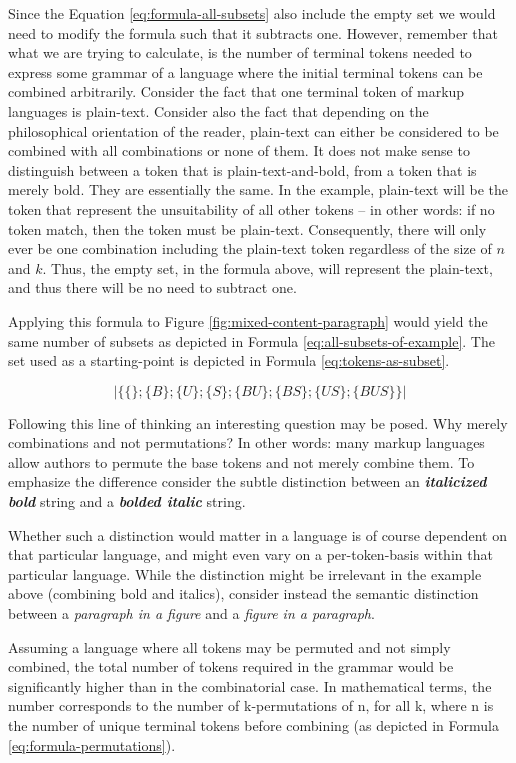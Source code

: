 \documentclass{scrreprt}
\begin{document}
Since the Equation \ref{eq:formula-all-subsets} also include the empty set we would need to modify the formula such that it subtracts one. However, remember that what we are trying to calculate, is the number of terminal tokens needed to express some grammar of a language where the initial terminal tokens can be combined arbitrarily. Consider the fact that one terminal token of markup languages is plain-text. Consider also the fact that depending on the philosophical orientation of the reader, plain-text can either be considered to be combined with all combinations or none of them. It does not make sense to distinguish between a token that is plain-text-and-bold, from a token that is merely bold. They are essentially the same. In the example, plain-text will be the token that represent the unsuitability of all other tokens -- in other words: if no token match, then the token must be plain-text. Consequently, there will only ever be one combination including the plain-text token regardless of the size of \(n\) and \(k\). Thus, the empty set, in the formula above, will represent the plain-text, and thus there will be no need to subtract one.

Applying this formula to Figure \ref{fig:mixed-content-paragraph} would yield the same number of subsets as depicted in Formula \ref{eq:all-subsets-of-example}. The set used as a starting-point is depicted in Formula \ref{eq:tokens-as-subset}.

\begin{equation}
|\{\{\};\{B\};\{U\};\{S\};\{BU\};\{BS\};\{US\};\{BUS\}\}|
\label{eq:all-subsets-of-example}
\end{equation}


Following this line of thinking an interesting question may be posed. Why merely combinations and not permutations? In other words: many markup languages allow authors to permute the base tokens and not merely combine them. To emphasize the difference consider the subtle distinction between an \textit{\textbf{italicized bold}} string and a \textit{\textbf{bolded italic}} string.

Whether such a distinction would matter in a language is of course dependent on that particular language, and might even vary on a per-token-basis within that particular language. While the distinction might be irrelevant in the example above (combining bold and italics), consider instead the semantic distinction between a \emph{paragraph in a figure} and a \emph{figure in a paragraph}.

Assuming a language where all tokens may be permuted and not simply combined, the total number of tokens required in the grammar would be significantly higher than in the combinatorial case. In mathematical terms, the number corresponds to the number of k-permutations of n, for all k, where n is the number of unique terminal tokens before combining (as depicted in Formula \ref{eq:formula-permutations}).
\end{document}
